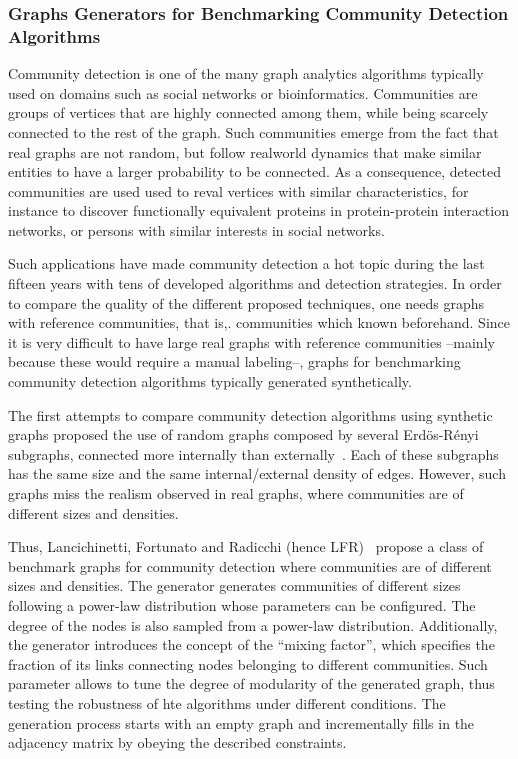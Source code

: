 \subsubsection{Graphs Generators for Benchmarking Community Detection Algorithms}
\label{sec:generators_community_detection}

Community detection is one of the many graph analytics algorithms typically used on domains such as social networks or bioinformatics. Communities are groups of vertices that are highly connected among them, while being scarcely connected to the rest of the graph. Such communities emerge from the fact that real graphs are not random, but follow realworld dynamics that make similar entities to have a larger probability to be connected. As a consequence, detected communities are used used to reval vertices with similar characteristics, for instance to discover functionally equivalent proteins in protein-protein interaction networks, or persons with similar interests in social networks. 

Such applications have made community detection a hot topic during the last fifteen years with tens of developed algorithms and detection strategies. In order to compare the quality of the different proposed techniques, one needs graphs with reference communities, that is,. communities which known beforehand. Since it is very difficult to have large real graphs with reference communities --mainly because these would require a manual labeling--, graphs for benchmarking community detection algorithms typically generated synthetically.

The first attempts to compare community detection algorithms using synthetic graphs proposed the use of random graphs composed by several Erd\"{o}s-R\'{e}nyi~\cite{Erdos:1960} subgraphs, connected more internally than externally~\cite{danon2005comparing}. Each of these subgraphs has the same size and the same internal/external density of edges. However, such graphs miss the realism observed in real graphs, where communities are of different sizes and densities. 

Thus, Lancichinetti, Fortunato and Radicchi (hence LFR)~\cite{PhysRevE.78.046110} propose a class of benchmark graphs for community detection where communities are of different sizes and densities. The generator generates communities of different sizes following a power-law distribution whose parameters can be configured. The degree of the nodes is also sampled from a power-law distribution. Additionally, the generator introduces the concept of the ``mixing factor'', which specifies the fraction of its links connecting nodes belonging to different communities. Such parameter allows to tune the degree of modularity of the generated graph, thus testing the robustness of hte algorithms under different conditions. The generation process starts with an empty graph and incrementally fills in the adjacency matrix by obeying the described constraints.

